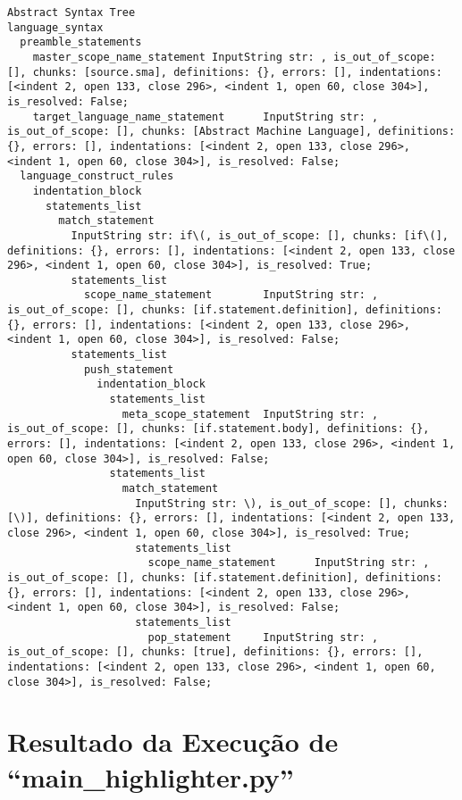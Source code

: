 \begin{code}
\begin{verbatim}
Abstract Syntax Tree
language_syntax
  preamble_statements
    master_scope_name_statement InputString str: , is_out_of_scope: [], chunks: [source.sma], definitions: {}, errors: [], indentations: [<indent 2, open 133, close 296>, <indent 1, open 60, close 304>], is_resolved: False;
    target_language_name_statement      InputString str: , is_out_of_scope: [], chunks: [Abstract Machine Language], definitions: {}, errors: [], indentations: [<indent 2, open 133, close 296>, <indent 1, open 60, close 304>], is_resolved: False;
  language_construct_rules
    indentation_block
      statements_list
        match_statement
          InputString str: if\(, is_out_of_scope: [], chunks: [if\(], definitions: {}, errors: [], indentations: [<indent 2, open 133, close 296>, <indent 1, open 60, close 304>], is_resolved: True;
          statements_list
            scope_name_statement        InputString str: , is_out_of_scope: [], chunks: [if.statement.definition], definitions: {}, errors: [], indentations: [<indent 2, open 133, close 296>, <indent 1, open 60, close 304>], is_resolved: False;
          statements_list
            push_statement
              indentation_block
                statements_list
                  meta_scope_statement  InputString str: , is_out_of_scope: [], chunks: [if.statement.body], definitions: {}, errors: [], indentations: [<indent 2, open 133, close 296>, <indent 1, open 60, close 304>], is_resolved: False;
                statements_list
                  match_statement
                    InputString str: \), is_out_of_scope: [], chunks: [\)], definitions: {}, errors: [], indentations: [<indent 2, open 133, close 296>, <indent 1, open 60, close 304>], is_resolved: True;
                    statements_list
                      scope_name_statement      InputString str: , is_out_of_scope: [], chunks: [if.statement.definition], definitions: {}, errors: [], indentations: [<indent 2, open 133, close 296>, <indent 1, open 60, close 304>], is_resolved: False;
                    statements_list
                      pop_statement     InputString str: , is_out_of_scope: [], chunks: [true], definitions: {}, errors: [], indentations: [<indent 2, open 133, close 296>, <indent 1, open 60, close 304>], is_resolved: False;
\end{verbatim}
\end{code}


\section{Resultado da Execução de ``main\_highlighter.py''}


